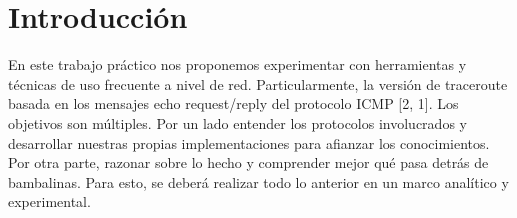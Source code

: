 \section{Introducción}

En este trabajo práctico nos proponemos experimentar con herramientas y técnicas de uso frecuente a
nivel de red. Particularmente, la versión de traceroute basada en los mensajes echo request/reply del
protocolo ICMP [2, 1]. Los objetivos son múltiples. Por un lado entender los protocolos involucrados y
desarrollar nuestras propias implementaciones para afianzar los conocimientos. Por otra parte, razonar sobre lo hecho y comprender mejor qué pasa detrás de bambalinas. Para esto, se deberá realizar todo lo anterior en un marco analítico y experimental.